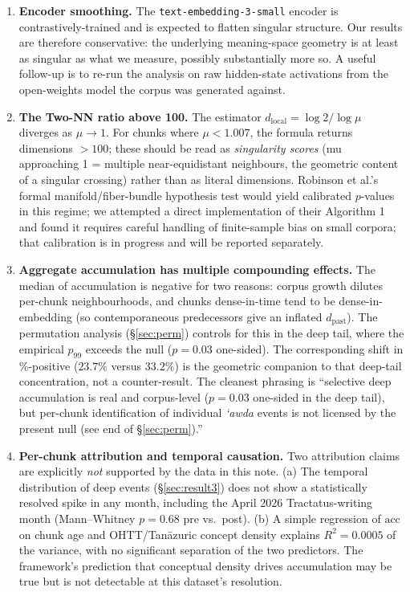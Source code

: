 \documentclass[11pt,a4paper]{article}
\theoremstyle{definition}
\newcommand{\dlocal}{d_{\mathrm{local}}}
\newcommand{\dpast}{d_{\mathrm{past}}}
\begin{document}
\begin{enumerate}[label=(\arabic*)]

\item \textbf{Encoder smoothing.} The \texttt{text-embedding-3-small}
encoder is contrastively-trained and is expected to flatten singular
structure. Our results are therefore conservative: the underlying
meaning-space geometry is at least as singular as what we measure,
possibly substantially more so. A useful follow-up is to re-run the
analysis on raw hidden-state activations from the open-weights model
the corpus was generated against.

\item \textbf{The Two-NN ratio above 100.} The estimator
$\dlocal = \log 2 / \log \mu$ diverges as $\mu \to 1$. For chunks where
$\mu < 1.007$, the formula returns dimensions $> 100$; these should be
read as \emph{singularity scores} (mu approaching 1 = multiple
near-equidistant neighbours, the geometric content of a singular
crossing) rather than as literal dimensions. Robinson et al.'s formal
manifold/fiber-bundle hypothesis test would yield calibrated $p$-values
in this regime; we attempted a direct implementation of their Algorithm 1
and found it requires careful handling of finite-sample bias on small
corpora; that calibration is in progress and will be reported separately.

\item \textbf{Aggregate accumulation has multiple compounding effects.}
The median of accumulation is negative for two reasons: corpus growth
dilutes per-chunk neighbourhoods, and chunks dense-in-time tend to be
dense-in-embedding (so contemporaneous predecessors give an inflated
$\dpast$). The permutation analysis (\S\ref{sec:perm}) controls for
this in the deep tail, where the empirical $p_{99}$ exceeds the null
($p=0.03$ one-sided). The corresponding shift in
\%-positive ($23.7\%$ versus $33.2\%$) is the geometric companion to
that deep-tail concentration, not a counter-result. The cleanest
phrasing is ``selective deep accumulation is real and corpus-level
($p = 0.03$ one-sided in the deep tail), but per-chunk identification
of individual \emph{`awda} events is not licensed by the present null
(see end of \S\ref{sec:perm}).''

\item \textbf{Per-chunk attribution and temporal causation.} Two
attribution claims are explicitly \emph{not} supported by the data
in this note. (a) The temporal distribution of deep events
(\S\ref{sec:result3}) does not show a statistically resolved spike
in any month, including the April 2026 Tractatus-writing month
(Mann--Whitney $p=0.68$ pre vs.\ post). (b) A simple regression of
$\mathrm{acc}$ on chunk age and OHTT/Tan\=azuric concept density
explains $R^2 = 0.0005$ of the variance, with no
significant separation of the two predictors. The framework's
prediction that conceptual density drives accumulation may be true
but is not detectable at this dataset's resolution.


\end{enumerate}
\end{document}
